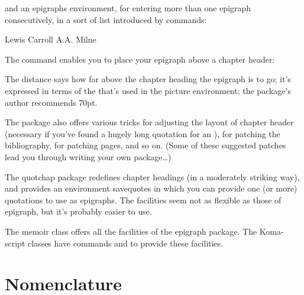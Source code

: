 and an epigraphs environment, for entering more than one epigraph consecutively, in a sort of list introduced by  commands:

\begin{Code}
   \begin{epigraphs}
            {Lewis Carroll}
            {A.A. Milne}
   \end{epigraphs}
\end{Code}

The  command enables you to place your epigraph above a chapter header:

\begin{Code}
    \setlength{\unitlength}{1pt}
      ...
    \chapter{The Social Life of Rabbits}
    \epigraphhead[<distance>]{%
    \epigraph{Oh!  My ears and whiskers!}%
                 {Lewis Carroll}%
 \end{Code}



The distance says how far above the chapter heading the epigraph is to go; it’s expressed in terms of the  that’s used in the picture environment; the package’s author recommends 70pt.

The package also offers various tricks for adjusting the layout of chapter header (necessary if you’ve found a hugely long quotation for an ), for patching the bibliography, for patching  pages, and so on. (Some of these suggested patches lead you through writing your own package…)

The quotchap package redefines chapter headings (in a moderately striking way), and provides an environment savequotes in which you can provide one (or more) quotations to use as epigraphs. The facilities seem not as flexible as those of epigraph, but it’s probably easier to use.

The memoir class offers all the facilities of the epigraph package. The Koma-script classes have commands  and  to provide these facilities.

\section{Nomenclature}

